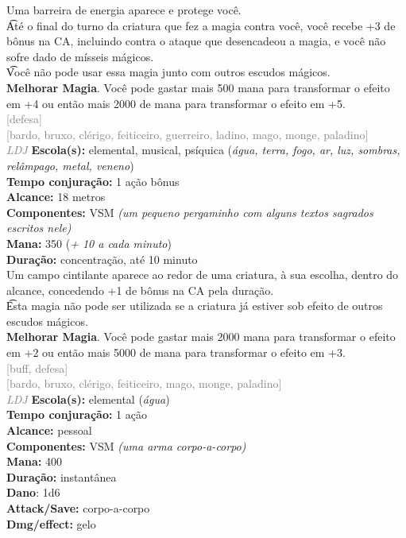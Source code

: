 \documentclass{RPG_Adventure}[2021/10/20]
\begin{document}
{\normalsize Uma barreira de energia aparece e protege você.\\\t Até o final do turno da criatura que fez a magia contra você, você recebe +3 de bônus na CA, incluindo contra o ataque que desencadeou a magia, e você não sofre dado de mísseis mágicos.\\\t Você não pode usar essa magia junto com outros escudos mágicos.\\\t \textbf{Melhorar Magia}. Você pode gastar mais 500 mana para transformar o efeito em +4 ou então mais 2000 de mana para transformar o efeito em +5.\\}
{\scriptsize \textcolor{gray}{[defesa]\\}}
{\scriptsize \textcolor{gray}{[bardo, bruxo, clérigo, feiticeiro, guerreiro, ladino, mago, monge, paladino]\\}}
{\tiny \textcolor{gray}{\textit{LDJ}}}
{\small \t \textbf{Escola(s):} elemental, musical, psíquica (\textit{água, terra, fogo, ar, luz, sombras, relâmpago, metal, veneno})\\\t \textbf{Tempo conjuração:} 1 ação bônus\\\t \textbf{Alcance:} 18 metros\\\t \textbf{Componentes:} VSM \textit{(um pequeno pergaminho com alguns textos sagrados escritos nele)}\\\t \textbf{Mana:} 350 (\textit{+ 10 a cada minuto})\\\t \textbf{Duração:} concentração, até 10 minuto\\}
{\normalsize Um campo cintilante aparece ao redor de uma criatura, à sua escolha, dentro do alcance, concedendo +1 de bônus na CA pela duração.\\\t Esta magia não pode ser utilizada se a criatura já estiver sob efeito de outros escudos mágicos.\\\t \textbf{Melhorar Magia}. Você pode gastar mais 2000 mana para transformar o efeito em +2 ou então mais 5000 de mana para transformar o efeito em +3.\\}
{\scriptsize \textcolor{gray}{[buff, defesa]\\}}
{\scriptsize \textcolor{gray}{[bardo, bruxo, clérigo, feiticeiro, mago, monge, paladino]\\}}
{\tiny \textcolor{gray}{\textit{LDJ}}}
{\small \t \textbf{Escola(s):} elemental (\textit{água})\\\t \textbf{Tempo conjuração:} 1 ação\\\t \textbf{Alcance:} pessoal\\\t \textbf{Componentes:} VSM \textit{(uma arma corpo-a-corpo)}\\\t \textbf{Mana:} 400\\\t \textbf{Duração:} instantânea\\\t \textbf{Dano}: 1d6\\\t \textbf{Attack/Save:} corpo-a-corpo\\\t \textbf{Dmg/effect:} gelo\\}
\end{document}
